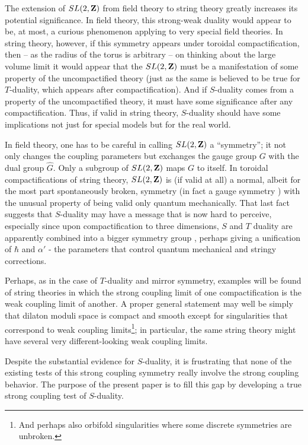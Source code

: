 \documentclass[12pt]{article}
\numberwithin{equation}{section}
\begin{document}
The extension of $SL(2,{\bf Z})$ from field theory to string theory
greatly increases its potential significance.  In field theory,
this strong-weak duality would appear to be, at most, a curious phenomenon
applying to very special field theories.  In string theory, however,
if this symmetry appears under toroidal compactification, then -- as the
radius of the torus is arbitrary -- on thinking about the large volume limit
it would appear that the $SL(2,{\bf Z})$ must be a manifestation of some
property of the uncompactified theory (just as the same is believed to be
true for $T$-duality, which appears after compactification).
And if $S$-duality comes from a property of the uncompactified theory,
it must have some significance after any compactification.  Thus,
if valid in string theory, $S$-duality should have some implications
not just for special models but for the real world.

In field theory,
one has to be careful in calling $SL(2,{\bf Z})$ a
``symmetry'';
it not only changes the coupling parameters  but exchanges the gauge
group $G$ with the dual group $\widehat G$.  Only a subgroup of
$SL(2,{\bf Z})$ maps $G$ to itself.
In toroidal compactifications of
string theory, $SL(2,{\bf Z})$ is (if valid at all) a normal,
albeit for the most part spontaneously broken, symmetry (in fact a gauge
symmetry \cite{seni}) with
the unusual property of being valid only quantum mechanically.
That last fact suggests that $S$-duality may have a message that
is now hard to perceive,
especially since upon compactification to three dimensions, $S$ and
$T$ duality are apparently combined
into a bigger symmetry group
\cite{seniii}, perhaps giving a unification  of $\hbar$
and $\alpha'$ - the parameters that control quantum mechanical and stringy
corrections.

Perhaps, as in the case of $T$-duality and mirror symmetry,
examples will be found of string theories in
which the strong coupling limit of one compactification is the weak
coupling limit of another.  A proper general statement may well
be simply that dilaton moduli space is compact and smooth
except for singularities
that correspond to weak coupling limits\footnote{And perhaps also
orbifold singularities where some discrete symmetries are unbroken.};
in particular, the same
string theory might have several very different-looking weak coupling
limits.

\bigskip
{}

Despite the substantial evidence for $S$-duality,
it is frustrating that none of the existing tests of this strong coupling
symmetry really involve the strong coupling behavior.
The purpose of the present paper is to fill this gap by developing
a true strong coupling test of $S$-duality.
\end{document}
